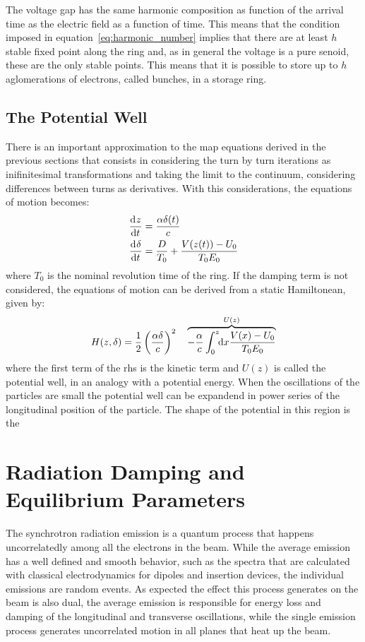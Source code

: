 	The voltage gap has the same harmonic composition as function of the arrival time as the electric field as a function of time. This means that the condition imposed in equation~\eqref{eq:harmonic_number} implies that there are at least $h$ stable fixed point along the ring and, as in general the voltage is a pure senoid, these are the only stable points. This means that it is possible to store up to $h$ aglomerations of electrons, called bunches, in a storage ring.

\subsection{The Potential Well}

	There is an important approximation to the map equations derived in the previous sections that consists in considering the turn by turn iterations as inifinitesimal transformations and taking the limit to the continuum, considering differences between turns as derivatives. With this considerations, the equations of motion becomes:
	\begin{align}
		\dertot{z}{t} &= \frac{\alpha \delta(t)}{c} \\\nonumber
		\dertot{\delta}{t} &= \frac{D}{T_0} + \frac{V(z(t))-U_0}{T_0E_0}
	\end{align}
	where $T_0$ is the nominal revolution time of the ring. If the damping term is not considered, the equations of motion can be derived from a static Hamiltonean, given by:
	\begin{align}
		H(z, \delta) = \frac12\left(\frac{\alpha\delta}{c}\right)^2 \quad \overbrace{- \frac{\alpha}{c}\defint{x}{\frac{V(x)-U_0}{T_0E_0}}{0}{z}}^{U(z)}
	\end{align}
	where the first term of the \gls{rhs} is the kinetic term and $U(z)$ is called the potential well, in an analogy with a potential energy. When the oscillations of the particles are small the potential well can be expandend in power series of the longitudinal position of the particle. The shape of the potential in this region is the

\section{Radiation Damping and Equilibrium Parameters}

    The synchrotron radiation emission is a quantum process that happens uncorrelatedly among all the electrons in the beam. While the average emission has a well defined and smooth behavior, such as the spectra that are calculated with classical electrodynamics for dipoles and insertion devices, the individual emissions are random events. As expected the effect this process generates on the beam is also dual, the average emission is responsible for energy loss and damping of the longitudinal and transverse oscillations, while the single emission process generates uncorrelated motion in all planes that heat up the beam.

